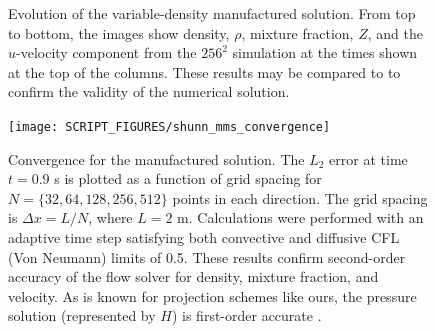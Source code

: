 \documentclass[11pt]{book}
\begin{document}
\begin{figure}[ht]

\caption[Evolution of the variable-density manufactured solution]{Evolution of the variable-density manufactured solution.  From top to bottom, the images show density, $\rho$, mixture fraction, $Z$, and the $u$-velocity component from the $256^2$ simulation at the times shown at the top of the columns.  These results may be compared to \cite{Shunn:2012} to confirm the validity of the numerical solution.}
\label{fig_mms_evo}
\end{figure}

\begin{figure}[ht]
\centering
\texttt{[image: SCRIPT\_FIGURES/shunn\_mms\_convergence]}
\caption[Convergence of the manufactured solution]{\label{fig_mms_convergence} Convergence for the manufactured solution.  The $L_2$ error at time $t = 0.9$ s is plotted as a function of grid spacing for $N=\{32,64,128,256,512\}$ points in each direction.  The grid spacing is $\Delta x = L/N$, where $L=2$ m.  Calculations were performed with an adaptive time step satisfying both convective and diffusive CFL (Von Neumann) limits of 0.5. These results confirm second-order accuracy of the flow solver for density, mixture fraction, and velocity. As is known for projection schemes like ours, the pressure solution (represented by $H$) is first-order accurate \cite{Armfield:2002}.}
\end{figure}
\end{document}
